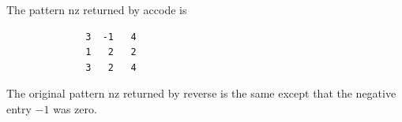 \documentclass[11pt,twoside]{article}
\begin{document}
\noindent The pattern {\sf nz} returned by {\sf accode} is
\begin{verbatim}
              3  -1   4
              1   2   2
              3   2   4
\end{verbatim}
The original pattern {\sf nz} returned by {\sf reverse} is the same
except that the negative entry $-1$ was zero. 
%
%

%
\end{document}
